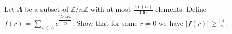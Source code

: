 Let \(A\) be a subset of \(\mathbb{Z}/n\mathbb{Z}\) with at most \(\frac{\ln(n)}{100}\) elements.
Define \(f(r)=\sum_{s\in A} e^{\dfrac{2 \pi i r s}{n}}\). Show that for some \(r \ne 0\) we have \(|f(r)| \geq \frac{|A|}{2}\).